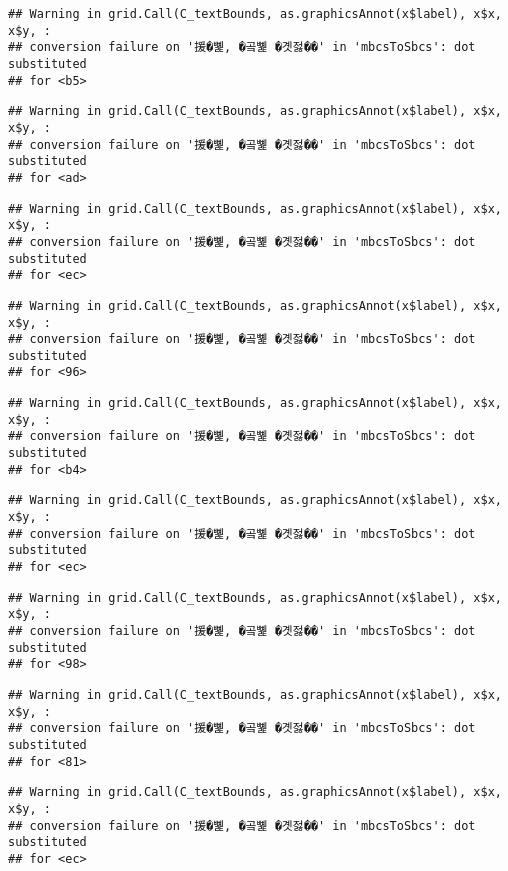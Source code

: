 \documentclass[
]{article}
\begin{document}
\begin{verbatim}
## Warning in grid.Call(C_textBounds, as.graphicsAnnot(x$label), x$x, x$y, :
## conversion failure on '援�뼱, �곸뼱 �곗젏��' in 'mbcsToSbcs': dot substituted
## for <b5>
\end{verbatim}

\begin{verbatim}
## Warning in grid.Call(C_textBounds, as.graphicsAnnot(x$label), x$x, x$y, :
## conversion failure on '援�뼱, �곸뼱 �곗젏��' in 'mbcsToSbcs': dot substituted
## for <ad>
\end{verbatim}

\begin{verbatim}
## Warning in grid.Call(C_textBounds, as.graphicsAnnot(x$label), x$x, x$y, :
## conversion failure on '援�뼱, �곸뼱 �곗젏��' in 'mbcsToSbcs': dot substituted
## for <ec>
\end{verbatim}

\begin{verbatim}
## Warning in grid.Call(C_textBounds, as.graphicsAnnot(x$label), x$x, x$y, :
## conversion failure on '援�뼱, �곸뼱 �곗젏��' in 'mbcsToSbcs': dot substituted
## for <96>
\end{verbatim}

\begin{verbatim}
## Warning in grid.Call(C_textBounds, as.graphicsAnnot(x$label), x$x, x$y, :
## conversion failure on '援�뼱, �곸뼱 �곗젏��' in 'mbcsToSbcs': dot substituted
## for <b4>
\end{verbatim}

\begin{verbatim}
## Warning in grid.Call(C_textBounds, as.graphicsAnnot(x$label), x$x, x$y, :
## conversion failure on '援�뼱, �곸뼱 �곗젏��' in 'mbcsToSbcs': dot substituted
## for <ec>
\end{verbatim}

\begin{verbatim}
## Warning in grid.Call(C_textBounds, as.graphicsAnnot(x$label), x$x, x$y, :
## conversion failure on '援�뼱, �곸뼱 �곗젏��' in 'mbcsToSbcs': dot substituted
## for <98>
\end{verbatim}

\begin{verbatim}
## Warning in grid.Call(C_textBounds, as.graphicsAnnot(x$label), x$x, x$y, :
## conversion failure on '援�뼱, �곸뼱 �곗젏��' in 'mbcsToSbcs': dot substituted
## for <81>
\end{verbatim}

\begin{verbatim}
## Warning in grid.Call(C_textBounds, as.graphicsAnnot(x$label), x$x, x$y, :
## conversion failure on '援�뼱, �곸뼱 �곗젏��' in 'mbcsToSbcs': dot substituted
## for <ec>
\end{verbatim}
\end{document}
